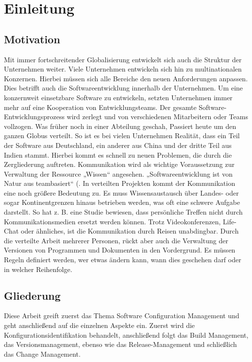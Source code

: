 \chapter {Einleitung}

\section {Motivation}
Mit immer fortschreitender Globalisierung entwickelt sich auch die Struktur der Unternehmen weiter. Viele Unternehmen entwickeln sich hin zu multinationalen Konzernen. Hierbei müssen sich alle Bereiche den neuen Anforderungen anpassen. Dies betrifft auch die Softwareentwicklung innerhalb der Unternehmen. Um eine konzernweit einsetzbare Software zu entwickeln, setzten Unternehmen immer mehr auf eine Kooperation von Entwicklungsteams. Der gesamte Software-Entwicklungsprozess wird zerlegt und von verschiedenen Mitarbeitern oder Teams vollzogen. Was früher noch in einer Abteilung geschah, Passiert heute um den ganzen Globus verteilt. So ist es bei vielen Unternehmen Realität, dass ein Teil der Software aus Deutschland, ein anderer aus China und der dritte Teil aus Indien stammt. Hierbei kommt es schnell zu neuen Problemen, die durch die Zergliederung auftreten. Kommunikation wird als wichtige Voraussetzung zur Verwaltung der Ressource „Wissen“ angesehen. „Softwareentwicklung ist von Natur aus teambasiert“ (\cite{einleitung}. In verteilten Projekten kommt der Kommunikation eine noch größere Bedeutung zu. Es muss Wissensaustausch über Landes- oder sogar Kontinentgrenzen hinaus betrieben werden, was oft eine schwere Aufgabe darstellt. So hat \acs{z. B.} eine Studie bewiesen, dass persönliche Treffen nicht durch Kommunikationsmedien ersetzt werden können. Trotz Videokonferenzen, Life-Chat oder ähnliches, ist die Kommunikation durch Reisen unabdingbar. Durch die verteilte Arbeit mehrerer Personen, rückt aber auch die Verwaltung der Versionen von Programmen und Dokumenten in den Vordergrund. Es müssen Regeln definiert werden, wer etwas ändern kann, wann dies geschehen darf oder in welcher Reihenfolge. 
\section{Gliederung}
Diese Arbeit greift zuerst das Thema Software Configuration Management und geht anschließend auf die einzelnen Aspekte ein.
Zuerst wird die Konfigurationsidentifikation behandelt, anschließend folgt das Build Management, das Versionsmanagement, ebenso wie das Release-Management und schließlich das Change Management.